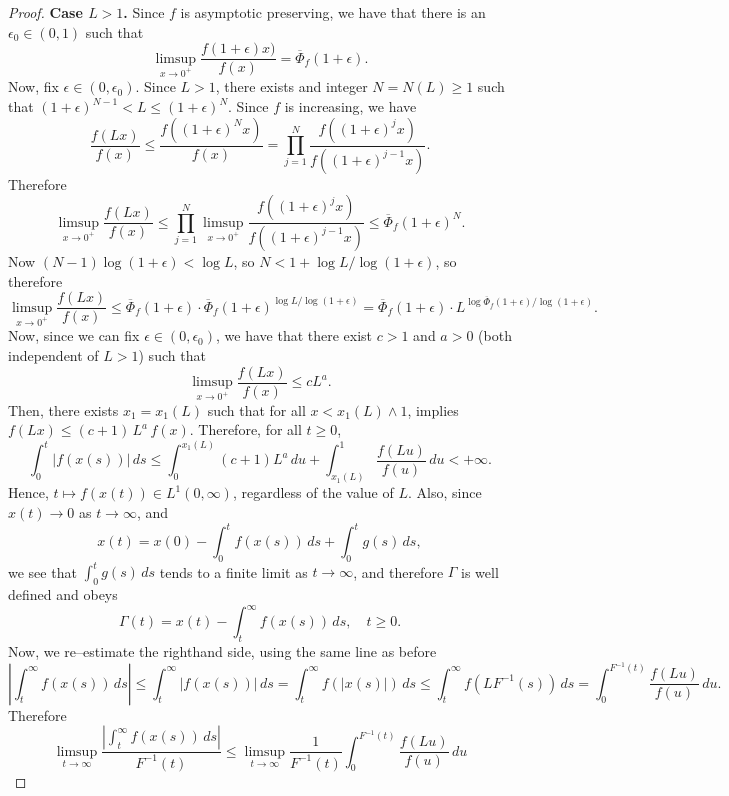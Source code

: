 \documentclass[a4paper,10pt,reqno]{amsart}
\numberwithin{equation}{section}
\theoremstyle{definition}
\theoremstyle{remark}
\DeclareMathOperator{\1}{\mathbbm 1}
\begin{document}
\begin{proof}
		\noindent\textbf{Case $L>1$.}  
		Since $f$ is asymptotic preserving, we have that there is an $\epsilon_0\in (0,1)$ such that 
		\[
		\limsup_{x\to 0^+} \frac{f(1+\epsilon)x)}{f(x)} = \overline{\Phi}_f(1+\epsilon).
		\]
		Now, fix $\epsilon\in (0,\epsilon_0)$. Since $L>1$, there exists and integer $N=N(L)\geq 1$ 	such that $(1+\epsilon)^{N-1}< L \leq (1+\epsilon)^N$. Since $f$ is increasing, we have 
		\[
		\frac{f(Lx)}{f(x)}\leq \frac{f((1+\epsilon)^Nx)}{f(x)}
		=\prod_{j=1}^{N} \frac{f((1+\epsilon)^jx)}{f((1+\epsilon)^{j-1}x)}.
		\]
		Therefore 
		\[
		\limsup_{x\to 0^+} 	\frac{f(Lx)}{f(x)} 
		\leq \prod_{j=1}^{N} \limsup_{x\to 0^+}\frac{f((1+\epsilon)^jx)}{f((1+\epsilon)^{j-1}x)}
		\leq \overline{\Phi}_f(1+\epsilon)^N.
		\]
		Now $(N-1)\log(1+\epsilon)<\log L$, so $N<1+\log L/\log(1+\epsilon)$, so therefore
		\[
		\limsup_{x\to 0^+} 	\frac{f(Lx)}{f(x)}\leq \overline{\Phi}_f(1+\epsilon) \cdot \overline{\Phi}_f(1+\epsilon)^{\log L/\log(1+\epsilon)}
		= \overline{\Phi}_f(1+\epsilon) \cdot L^{\log \overline{\Phi}_f(1+\epsilon)/\log(1+\epsilon)}.
		\]
		Now, since we can fix $\epsilon\in (0,\epsilon_0)$, we have that there exist $c>1$ and $a>0$ (both independent of $L>1$) such that 
		\[
		\limsup_{x\to 0^+} 	\frac{f(Lx)}{f(x)}\leq c L^a.
		\] 
		Then, there exists $x_{1}=x_{1}(L)$ such that for all $x<x_{1}(L) \land 1$,
		implies $f(Lx) \le (c+1)\,L^{a}\,f(x)$. 
		Therefore, for all $t \geq 0$,
		\[
		\int_0^t |f(x(s))|\, ds \le 
		\int_0^{x_1(L)} (c+1)L^a \, du + \int_{x_1(L)}^{1} \frac{f(Lu)}{f(u)} \, du < +\infty.
		\]
		Hence, $t \mapsto f(x(t)) \in L^1(0,\infty)$, regardless of the value of $L$. Also, since $x(t) \to 0$ as $t \to \infty$, and 
		\[
		x(t)=x(0)-\int_0^t f(x(s))\,ds + \int_0^t g(s)\,ds,
		\]
		we see that $\int_0^t g(s)\,ds$ tends to a finite limit as $t\to\infty$, and therefore $\Gamma$ is well defined and obeys  
		\[
		\Gamma(t)=x(t)-\int_t^\infty f(x(s))\,ds, \quad t\geq 0.
		\]
		Now, we re--estimate the righthand side, using the same line as before
		\[
		\left| \int_t^\infty f(x(s)) \, ds \right| \le \int_t^\infty |f(x(s))| \, ds
		= \int_t^\infty f(|x(s)|) \, ds \le \int_t^\infty f(L F^{-1}(s)) \, ds
		= \int_0^{F^{-1}(t)} \frac{f(Lu)}{f(u)} \, du.
		\]
		Therefore
		\[
		\limsup_{t \to \infty} \frac{\left|\int_t^\infty f(x(s))\, ds \right|}{F^{-1}(t)}
		\leq \limsup_{t \to \infty} \frac{1}{F^{-1}(t)} \int_0^{F^{-1}(t)} \frac{f(Lu)}{f(u)} \, du
\]
\end{proof}
\end{document}

